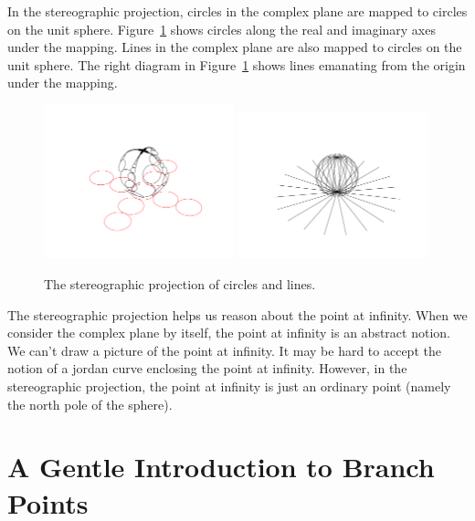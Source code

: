 In the stereographic projection, circles in the complex plane are mapped 
to circles on the unit sphere.  Figure~\ref{figure stereo-circle stereo-lines}
shows circles along the real and imaginary axes under the mapping.
Lines in the complex plane are also mapped 
to circles on the unit sphere.  The right diagram in 
Figure~\ref{figure stereo-circle stereo-lines} shows
lines emanating from the origin under the mapping.
\begin{figure}[htbp!]
  \begin{center}
    \includegraphics[width=0.49\textwidth]{fcv/function/stereo-circle}
    \includegraphics[width=0.49\textwidth]{fcv/function/stereo-line}
  \end{center}
  \caption{The stereographic projection of circles and lines.}
  \label{figure stereo-circle stereo-lines}
\end{figure}


The stereographic projection helps us reason about the point at infinity.
When we consider the complex plane by itself, the point at infinity is an 
abstract notion.  We can't draw a picture of the point at infinity.  It may 
be hard to accept the notion of a jordan curve enclosing the point at 
infinity.  However, in the stereographic projection, the point at infinity
is just an ordinary point (namely the north pole of the sphere).  



\section{A Gentle Introduction to Branch Points}



